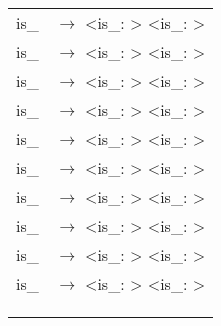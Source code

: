 \documentclass[a4paper]{article}
\begin{document}
\begin{tabular}{ll}
	is\_ & $\to$ <is\_: > <is\_: > \\
	is\_ & $\to$ <is\_: > <is\_: > \\
	is\_ & $\to$ <is\_: > <is\_: > \\
	is\_ & $\to$ <is\_: > <is\_: > \\
	is\_ & $\to$ <is\_: > <is\_: > \\
	is\_ & $\to$ <is\_: > <is\_: > \\
	is\_ & $\to$ <is\_: > <is\_: > \\
	is\_ & $\to$ <is\_: > <is\_: > \\
	is\_ & $\to$ <is\_: > <is\_: > \\
	is\_ & $\to$ <is\_: > <is\_: > \\
\begin{comment}

\end{comment}


	& \\
	& \\ %
	& \\


\end{tabular}
\end{document}
